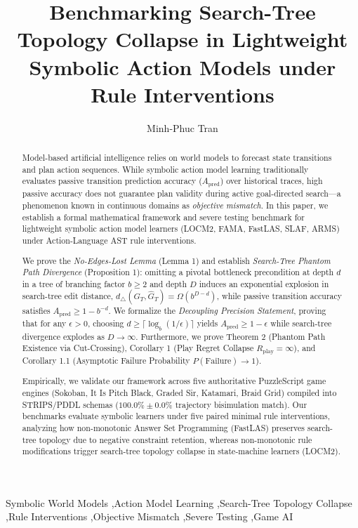 \documentclass[preprint,12pt,3p]{elsarticle}
\begin{document}
\begin{frontmatter}

\title{Benchmarking Search-Tree Topology Collapse in Lightweight Symbolic Action Models under Rule Interventions}

\author[inst1]{Minh-Phuc Tran}

\begin{abstract}
Model-based artificial intelligence relies on world models to forecast state transitions and plan action sequences. While symbolic action model learning traditionally evaluates passive transition prediction accuracy ($A_{\text{pred}}$) over historical traces, high passive accuracy does not guarantee plan validity during active goal-directed search---a phenomenon known in continuous domains as \textit{objective mismatch}. In this paper, we establish a formal mathematical framework and severe testing benchmark for lightweight symbolic action model learners (LOCM2, FAMA, FastLAS, SLAF, ARMS) under Action-Language AST rule interventions.

We prove the \textit{No-Edges-Lost Lemma} (Lemma 1) and establish \textit{Search-Tree Phantom Path Divergence} (Proposition 1): omitting a pivotal bottleneck precondition at depth $d$ in a tree of branching factor $b \ge 2$ and depth $D$ induces an exponential explosion in search-tree edit distance, $d_\triangle(G_T, \hat{G}_T) = \Omega(b^{D-d})$, while passive transition accuracy satisfies $A_{\text{pred}} \ge 1 - b^{-d}$. We formalize the \textit{Decoupling Precision Statement}, proving that for any $\epsilon > 0$, choosing $d \ge \lceil \log_b(1/\epsilon) \rceil$ yields $A_{\text{pred}} \ge 1 - \epsilon$ while search-tree divergence explodes as $D \to \infty$. Furthermore, we prove Theorem 2 (Phantom Path Existence via Cut-Crossing), Corollary 1 (Play Regret Collapse $R_{\text{play}} = \infty$), and Corollary 1.1 (Asymptotic Failure Probability $P(\text{Failure}) \to 1$). 

Empirically, we validate our framework across five authoritative PuzzleScript game engines (Sokoban, It Is Pitch Black, Graded Sir, Katamari, Braid Grid) compiled into STRIPS/PDDL schemas ($100.0\% \pm 0.0\%$ trajectory bisimulation match). Our benchmarks evaluate symbolic learners under five paired minimal rule interventions, analyzing how non-monotonic Answer Set Programming (FastLAS) preserves search-tree topology due to negative constraint retention, whereas non-monotonic rule modifications trigger search-tree topology collapse in state-machine learners (LOCM2).
\end{abstract}

\begin{keyword}
Symbolic World Models \sep Action Model Learning \sep Search-Tree Topology Collapse \sep Rule Interventions \sep Objective Mismatch \sep Severe Testing \sep Game AI
\end{keyword}

\end{frontmatter}
\end{document}
